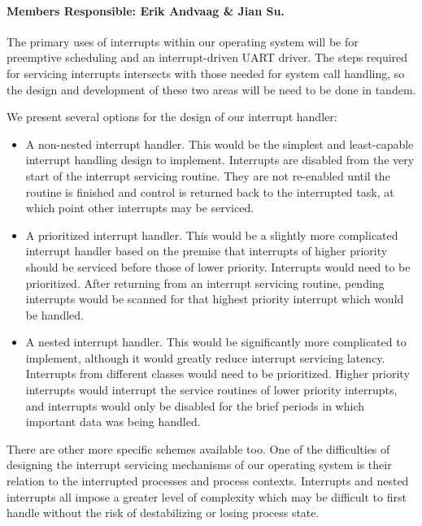 \documentclass[12pt]{article}
\begin{document}
\paragraph{Members Responsible: Erik Andvaag \& Jian Su.}

The primary uses of interrupts within our operating system will be for
preemptive scheduling and an interrupt-driven UART driver. The steps
required for servicing interrupts intersects with those needed for system
call handling, so the design and development of these two areas will be need
to be done in tandem.

We present several options for the design of our interrupt handler:
\begin{itemize}
  \item A non-nested interrupt handler.  This would be the simplest and
      least-capable interrupt handling design to implement.  Interrupts
      are disabled from the very start of the interrupt servicing routine.
      They are not re-enabled until the routine is finished and control is
      returned back to the interrupted task, at which point other
      interrupts may be serviced.
  \item A prioritized interrupt handler.  This would be a slightly more
      complicated interrupt handler based on the premise that interrupts
      of higher priority should be serviced before those of lower
      priority.  Interrupts would need to be prioritized.  After returning
      from an interrupt servicing routine, pending interrupts would be
      scanned for that highest priority interrupt which would be handled.
  \item A nested interrupt handler.  This would be significantly more
      complicated to implement, although it would greatly reduce interrupt
      servicing latency.  Interrupts from different classes would need to
      be prioritized.  Higher priority interrupts would interrupt the
      service routines of lower priority interrupts, and interrupts would
      only be disabled for the brief periods in which important data was
      being handled.
\end{itemize}
There are other more specific schemes available too.  One of the
difficulties of designing the interrupt servicing mechanisms of our
operating system is their relation to the interrupted processes and process
contexts.  Interrupts and nested interrupts all impose a greater level of
complexity which may be difficult to first handle without the risk of
destabilizing or losing process state.
\end{document}
